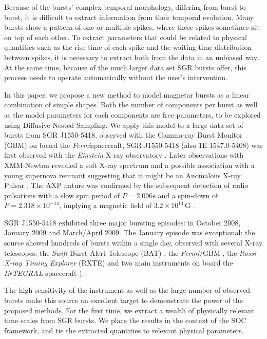 \documentclass[12pt]{emulateapj}
\newcommand{\project}[1]{\textsl{#1}}
\newcommand{\Fermi}{\project{Fermi}}
\begin{document}

Because of the bursts' complex temporal morphology, differing from burst to burst, it is difficult to extract information from their temporal evolution. 
Many bursts show a pattern of one or multiple spikes, where these spikes sometimes sit on top of each other. To extract parameters that could be related
to physical quantities such as the rise time of each spike and the waiting time distribution between spikes, it is necessary to 
extract both from the data in an unbiased way. At the same time, because of the much larger data set SGR bursts offer, this process
needs to operate automatically without the user's intervention.

In this paper, we propose a new method to model magnetar bursts as a linear combination of simple shapes. Both the number of components
per burst as well as the model parameters for each components are free parameters, to be explored using Diffusive Nested Sampling.
We apply this model to a large data set of bursts from SGR J1550-5418, observed with the Gamma-ray Burst Monitor (GBM) on board the 
\Fermi spacecraft, 
SGR J1550-5418 (also 1E 1547.0-5408) was first observed with the {\it Einstein} X-ray observatory \citep{lamb81}. Later observations with XMM-Newton revealed a soft X-ray spectrum and a possible association with a young supernova remnant suggesting that it might be an Anomalous X-ray Pulsar \citep[AXP][]{gelfand07}. The AXP nature was confirmed  by the subsequent detection of radio pulsations with a slow spin period of $P = 2.096\mathrm{s}$ and a spin-down of $\dot{P} = 2.318 \times 10^{-14}$, implying a magnetic field of $3.2 \times 10^{14} \, \mathrm{G}$ \citep{Camilo07}. 

SGR J1550-5418 exhibited three major bursting episodes: in October 2008, January 2009 and March/April 2009. The January episode was exceptional: the source showed hundreds of bursts within a single day, observed with several X-ray telescopes: the {\it Swift} Burst Alert Telescope (BAT) \citep{israel10, scholz11}, the \Fermi/GBM \citep{kaneko10,vonkienlin12,vanderhorst12}, the {\it Rossi X-ray Timing Explorer} (RXTE) \citep{dib12} and two main instruments on board the {\it INTEGRAL} spacecraft \citep{mereghetti09, savchenko10}).

The high sensitivity of the instrument as well as the large number of observed bursts make this source an excellent target to demonstrate the power of the proposed methods. For the first time, we extract a wealth of 
physically relevant time scales from SGR bursts. We place the results in the context of the SOC framework, and tie the extracted quantities to relevant physical parameters.
\end{document}
